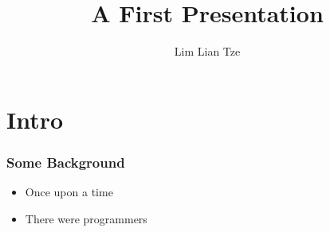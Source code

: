 \documentclass{beamer}
\author{Lim Lian Tze}
\title{A First Presentation}
\begin{document}
\frame{\titlepage}

\section{Intro}

\begin{frame}
\frametitle{Some Background}
\begin{itemize}
\item Once upon a time
\item There were programmers
\end{itemize}
\end{frame}
\end{document}
